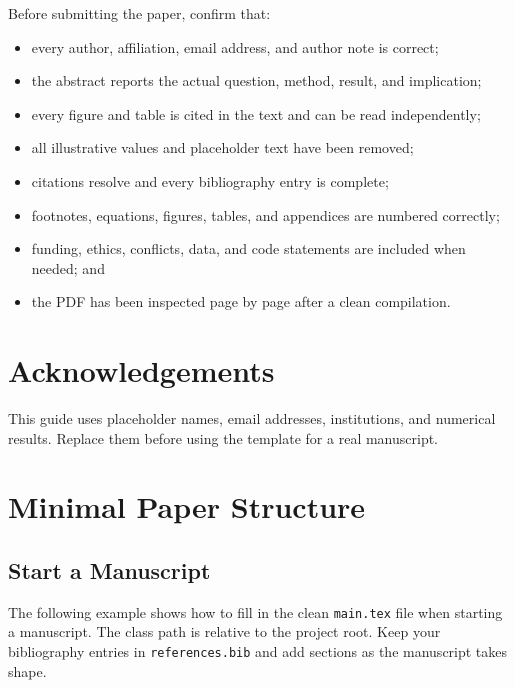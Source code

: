 \documentclass{templates/aidealabs-paper}
\begin{document}
Before submitting the paper, confirm that:

\begin{itemize}
  \item every author, affiliation, email address, and author note is correct;
  \item the abstract reports the actual question, method, result, and implication;
  \item every figure and table is cited in the text and can be read independently;
  \item all illustrative values and placeholder text have been removed;
  \item citations resolve and every bibliography entry is complete;
  \item footnotes, equations, figures, tables, and appendices are numbered correctly;
  \item funding, ethics, conflicts, data, and code statements are included when needed; and
  \item the PDF has been inspected page by page after a clean compilation.
\end{itemize}

\section*{Acknowledgements}

This guide uses placeholder names, email addresses, institutions, and numerical results. Replace them before using the template for a real manuscript.

\clearpage
\printbibliography

\clearpage
\appendix
\section{Minimal Paper Structure}

\subsection{Start a Manuscript}

The following example shows how to fill in the clean \texttt{main.tex} file when starting a manuscript.
The class path is relative to the project root.
Keep your bibliography entries in \texttt{references.bib} and add sections as the manuscript takes shape.
\end{document}
